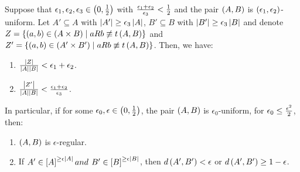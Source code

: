     \lemma[Lemma 5.17]\label{excellence_implies_regularity}
        Suppose that $\epsilon_1, \epsilon_2, \epsilon_3 \in \left( 0, {1 \over 2} \right)$ with
        ${{\epsilon_1 + \epsilon_2} \over \epsilon_3} < {1 \over 2}$ and the pair $\left( A,B \right)$ is
        $\left( \epsilon_1, \epsilon_2 \right)$-uniform.
        Let $A' \subseteq A$ with $\left| A' \right| \geq \epsilon_3 \left| A \right|$,
        $B' \subseteq B$ with $\left| B' \right| \geq \epsilon_3 \left| B \right|$ and
        denote $Z = \left\{ \left( a,b \right) \in \left( A \times B \right) \mid a R b \not\equiv t\left( A,B \right) \right\}$ and
        $Z' = \left\{ \left( a,b \right) \in \left( A' \times B' \right) \mid a R b \not\equiv t\left( A,B \right) \right\}$.
        Then, we have:
        \begin{enumerate}
            \item \label{itm:5.17.1} ${\left| Z \right| \over {\left| A \right| \left| B \right|}} < \epsilon_1 + \epsilon_2$.
            \item \label{itm:5.17.2} ${\left| Z' \right| \over {\left| A \right| \left| B \right|}} <
                {{\epsilon_1 + \epsilon_2} \over \epsilon_3}$.
        \end{enumerate}
        In particular, if for some $\epsilon_0, \epsilon \in \left( 0, {1 \over 2} \right)$, the pair
        $\left( A,B \right)$ is $\epsilon_0$-uniform, for $\epsilon_0 \leq {{\epsilon^2} \over 2}$, then:
        \begin{enumerate}[label=\alph*., ref=\alph*]
            \item \label{itm:5.17.a} $\left( A,B \right)$ is $\epsilon$-regular.
            \item \label{itm:5.17.b} If $A' \in \left[ A \right]^{\geq \epsilon \left| A \right|} and $
                $B' \in \left[ B \right]^{\geq \epsilon \left| B \right|}$, then $d \left( A',B' \right) < \epsilon$ or
                $d \left( A',B' \right) \geq 1 - \epsilon$.
        \end{enumerate}
